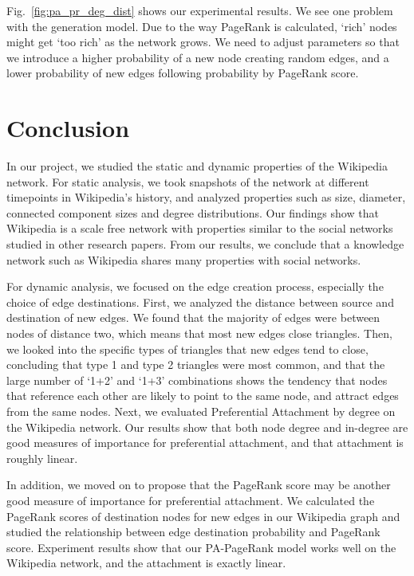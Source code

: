 \documentclass[10pt,twocolumn]{article}
\begin{document}
Fig.~\ref{fig:pa_pr_deg_dist} shows our experimental results. We see one problem with the generation model. Due to the way PageRank is calculated, `rich' nodes might get `too rich' as the network grows. We need to adjust parameters so that we introduce a higher probability of a new node creating random edges, and a lower probability of new edges following probability by PageRank score.

\section{Conclusion} 
In our project, we studied the static and dynamic properties of the Wikipedia network. For static analysis, we took snapshots of the network at different timepoints in Wikipedia's history, and analyzed properties such as size, diameter, connected component sizes and degree distributions. Our findings show that Wikipedia is a scale free network with properties similar to the social networks studied in other research papers. From our results, we conclude that a knowledge network such as Wikipedia shares many properties with social networks.

For dynamic analysis, we focused on the edge creation process, especially the choice of edge destinations. First, we analyzed the distance between source and destination of new edges. We found that the majority of edges were between nodes of distance two, which means that most new edges close triangles. Then, we looked into the specific types of triangles that new edges tend to close, concluding that type 1 and type 2 triangles were most common, and that the large number of `1+2' and `1+3' combinations shows the tendency that nodes that reference each other are likely to point to the same node, and attract edges from the same nodes. Next, we evaluated Preferential Attachment by degree on the Wikipedia network. Our results show that both node degree and in-degree are good measures of importance for preferential attachment, and that attachment is roughly linear.

In addition, we moved on to propose that the PageRank score may be another good measure of importance for preferential attachment. We calculated the PageRank scores of destination nodes for new edges in our Wikipedia graph and studied the relationship between edge destination probability and PageRank score. Experiment results show that our PA-PageRank model works well on the Wikipedia network, and the attachment is exactly linear.



\end{document}
